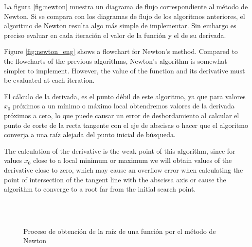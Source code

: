 \begin{paracol}{2}

La figura \ref{fig:newton} muestra un diagrama de flujo correspondiente al método de Newton. Si se compara con los diagramas de flujo de los algoritmos anteriores, el algoritmo de Newton resulta algo más simple de implementar. Sin embargo es preciso evaluar en cada iteración el valor de la función y el de su derivada. 

\switchcolumn

Figure \ref{fig:newton_eng} shows a flowchart for Newton's method. Compared to the flowcharts of the previous algorithms, Newton's algorithm is somewhat simpler to implement. However, the value of the function and its derivative must be evaluated at each iteration. 

\switchcolumn

El cálculo de la derivada, es el punto débil de este algoritmo, ya que para valores $x_0$ próximos a un mínimo o máximo local obtendremos valores de la derivada próximos a cero, lo que puede causar un error de desbordamiento al calcular el punto de corte de la recta tangente con el eje de abscisas o hacer que el algoritmo converja a una raíz alejada del punto inicial de búsqueda.
 
\switchcolumn

The calculation of the derivative is the weak point of this algorithm, since for values $x_0$ close to a local minimum or maximum we will obtain values of the derivative close to zero, which may cause an overflow error when calculating the point of intersection of the tangent line with the abscissa axis or cause the algorithm to converge to a root far from the initial search point.

\end{paracol}
\newpage
\begin{figure}

\centering
{} \qquad
{}\\
\qquad
{}\\
\qquad
{}

\caption{Proceso de obtención de la raíz de una función por el método de Newton}
\label{fig:newton2}
\end{figure}





